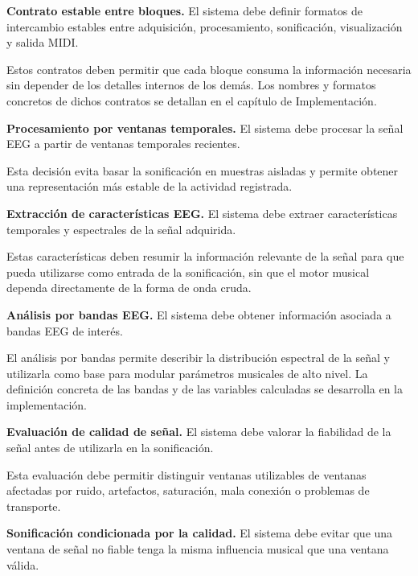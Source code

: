 \documentclass[../main.tex]{subfiles}
\begin{document}
\begin{description}[leftmargin=!,labelwidth=2cm]
    \item[RF-6] \textbf{Contrato estable entre bloques.} El sistema debe definir formatos de intercambio estables entre adquisición, procesamiento, sonificación, visualización y salida MIDI.

    Estos contratos deben permitir que cada bloque consuma la información necesaria sin depender de los detalles internos de los demás. Los nombres y formatos concretos de dichos contratos se detallan en el capítulo de Implementación.

    \item[RF-7] \textbf{Procesamiento por ventanas temporales.} El sistema debe procesar la señal EEG a partir de ventanas temporales recientes.

    Esta decisión evita basar la sonificación en muestras aisladas y permite obtener una representación más estable de la actividad registrada.

    \item[RF-8] \textbf{Extracción de características EEG.} El sistema debe extraer características temporales y espectrales de la señal adquirida.

    Estas características deben resumir la información relevante de la señal para que pueda utilizarse como entrada de la sonificación, sin que el motor musical dependa directamente de la forma de onda cruda.

    \item[RF-9] \textbf{Análisis por bandas EEG.} El sistema debe obtener información asociada a bandas EEG de interés.

    El análisis por bandas permite describir la distribución espectral de la señal y utilizarla como base para modular parámetros musicales de alto nivel. La definición concreta de las bandas y de las variables calculadas se desarrolla en la implementación.

    \item[RF-10] \textbf{Evaluación de calidad de señal.} El sistema debe valorar la fiabilidad de la señal antes de utilizarla en la sonificación.

    Esta evaluación debe permitir distinguir ventanas utilizables de ventanas afectadas por ruido, artefactos, saturación, mala conexión o problemas de transporte.

    \item[RF-11] \textbf{Sonificación condicionada por la calidad.} El sistema debe evitar que una ventana de señal no fiable tenga la misma influencia musical que una ventana válida.


\end{description}
\end{document}
